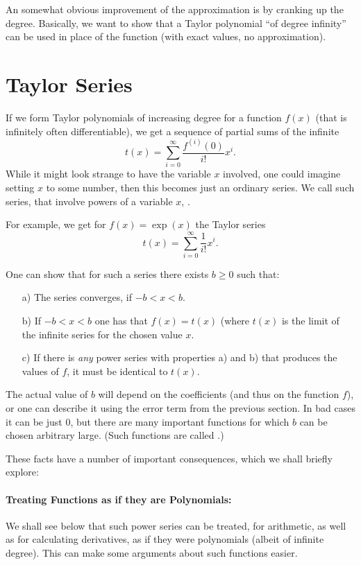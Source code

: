 An somewhat obvious improvement of the approximation is by cranking up the
degree. Basically, we want to show that a Taylor polynomial ``of degree
infinity'' can be used in place of the function (with exact values, no
approximation).


\section{Taylor Series}
\label{sectaylors}

If we form Taylor polynomials of increasing degree for a function $f(x)$
(that is infinitely often differentiable),
we get a sequence of partial sums of the infinite
\[
t(x)=\sum_{i=0}^\infty\frac{f^{(i)}(0)}{i!} x^i.
\]
While it might look strange to have the variable $x$ involved, one could
imagine setting $x$ to some number, then this becomes just an ordinary
series. We call such series, that involve powers of a variable $x$,
.

For example, we get for $f(x)=\exp(x)$ the Taylor series
\[
t(x)=\sum_{i=0}^\infty\frac{1}{i!} x^i.
\]

One can show that for such a series there exists $b\ge 0$ such that:
\begin{itemize}
\item[a)]
The
series converges, if $-b<x<b$.
\item[b)]
If $-b<x<b$ one has that $f(x)=t(x)$ (where $t(x)$ is the limit of the
infinite series for the chosen value $x$.
\item[c)] If there is {\em any} power series with properties a) and b) that
produces the values of $f$, it must be identical to $t(x)$.
\end{itemize}
The actual value of $b$ will depend on the
coefficients (and thus on the function $f$), or one can describe it using
the error term from the previous section.
In bad cases it can be just $0$, but there are many important functions for
which $b$ can be chosen arbitrary large. (Such functions are called
.)
\medskip

These facts have a number of important consequences, which we shall briefly
explore:
\paragraph{Treating Functions as if they are Polynomials:}
We shall see below that such power series can be treated, for arithmetic, as
well as for calculating derivatives, as if they were polynomials (albeit of
infinite degree). This can make some arguments about such functions easier.

